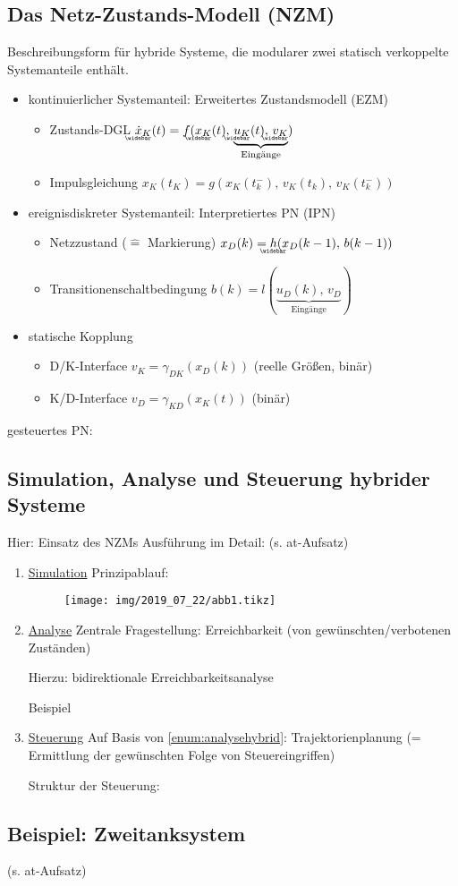 \subsection{Das Netz-Zustands-Modell (NZM)}
Beschreibungsform für hybride Systeme, die modularer zwei statisch verkoppelte Systemanteile enthält.

\begin{itemize}
	\item kontinuierlicher Systemanteil: Erweitertes Zustandsmodell (EZM)
	\begin{itemize}
		\item Zustands-DGL $\wbar{\dot{x}}_K(t) = f(\wbar{x}_K(t),\,\underbrace{\wbar{u}_K(t),\,\wbar{v}_K}_{\text{Eingänge}})$
		\item Impulsgleichung $x_K(t_K) = g(x_K(t_k^-),\,v_K(t_k),\,v_K(t_k^-))$
	\end{itemize}
	\item ereignisdiskreter Systemanteil: Interpretiertes PN (IPN)
	\begin{itemize}
		\item Netzzustand ($\hat{=}$ Markierung) $x_D(k) = \wbar{h}(x_D(k-1),\,b(k-1))$
		\item Transitionenschaltbedingung $b(k) = l(\underbrace{u_D(k),\,v_D}_\text{Eingänge})$
	\end{itemize}
	\item statische Kopplung
	\begin{itemize}
		\item D/K-Interface $v_K = \gamma_{DK}(x_D(k))$ (reelle Größen, binär)
		\item K/D-Interface $v_D = \gamma_{KD}(x_K(t))$ (binär)
	\end{itemize}
\end{itemize}

gesteuertes PN: 

\subsection{Simulation, Analyse und Steuerung hybrider Systeme}
Hier: Einsatz des NZMs
Ausführung im Detail: (s. at-Aufsatz)

\begin{enumerate}
	\item \underline{Simulation}
	Prinzipablauf:
	\begin{figure}[H]
		\centering
		\texttt{[image: img/2019\_07\_22/abb1.tikz]}
	\end{figure}
	
	\item \underline{Analyse} \label{enum:analysehybrid}
	Zentrale Fragestellung: Erreichbarkeit (von gewünschten/verbotenen Zuständen)
	
	Hierzu: bidirektionale Erreichbarkeitsanalyse 
	
	Beispiel
	\item \underline{Steuerung}
	Auf Basis von \ref{enum:analysehybrid}: Trajektorienplanung (= Ermittlung der gewünschten Folge von Steuereingriffen)
	
	Struktur der Steuerung: 
\end{enumerate}

\subsection{Beispiel: Zweitanksystem}
(s. at-Aufsatz)


